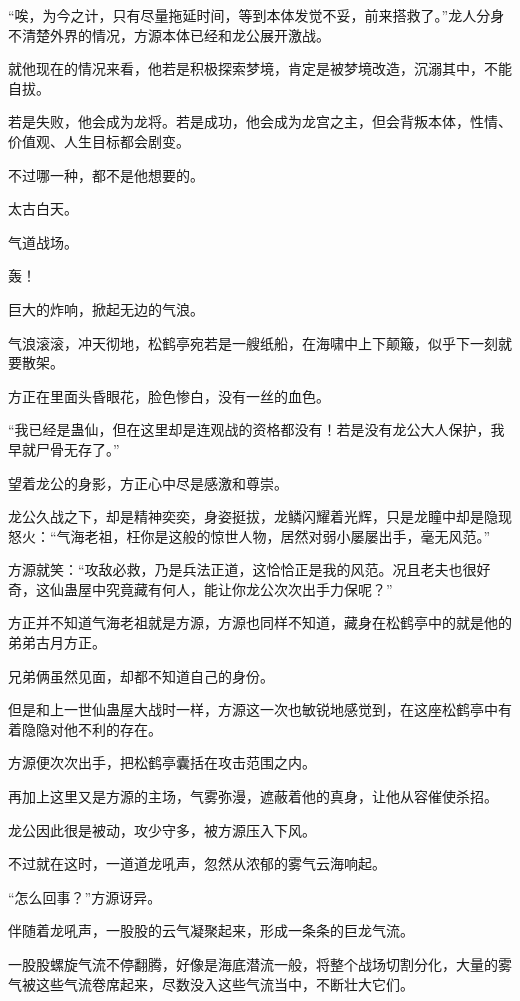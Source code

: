 \begin{this_body}
“唉，为今之计，只有尽量拖延时间，等到本体发觉不妥，前来搭救了。”龙人分身不清楚外界的情况，方源本体已经和龙公展开激战。

就他现在的情况来看，他若是积极探索梦境，肯定是被梦境改造，沉溺其中，不能自拔。

若是失败，他会成为龙将。若是成功，他会成为龙宫之主，但会背叛本体，性情、价值观、人生目标都会剧变。

不过哪一种，都不是他想要的。

太古白天。

气道战场。

轰！

巨大的炸响，掀起无边的气浪。

气浪滚滚，冲天彻地，松鹤亭宛若是一艘纸船，在海啸中上下颠簸，似乎下一刻就要散架。

方正在里面头昏眼花，脸色惨白，没有一丝的血色。

“我已经是蛊仙，但在这里却是连观战的资格都没有！若是没有龙公大人保护，我早就尸骨无存了。”

望着龙公的身影，方正心中尽是感激和尊崇。

龙公久战之下，却是精神奕奕，身姿挺拔，龙鳞闪耀着光辉，只是龙瞳中却是隐现怒火：“气海老祖，枉你是这般的惊世人物，居然对弱小屡屡出手，毫无风范。”

方源就笑：“攻敌必救，乃是兵法正道，这恰恰正是我的风范。况且老夫也很好奇，这仙蛊屋中究竟藏有何人，能让你龙公次次出手力保呢？”

方正并不知道气海老祖就是方源，方源也同样不知道，藏身在松鹤亭中的就是他的弟弟古月方正。

兄弟俩虽然见面，却都不知道自己的身份。

但是和上一世仙蛊屋大战时一样，方源这一次也敏锐地感觉到，在这座松鹤亭中有着隐隐对他不利的存在。

方源便次次出手，把松鹤亭囊括在攻击范围之内。

再加上这里又是方源的主场，气雾弥漫，遮蔽着他的真身，让他从容催使杀招。

龙公因此很是被动，攻少守多，被方源压入下风。

不过就在这时，一道道龙吼声，忽然从浓郁的雾气云海响起。

“怎么回事？”方源讶异。

伴随着龙吼声，一股股的云气凝聚起来，形成一条条的巨龙气流。

一股股螺旋气流不停翻腾，好像是海底潜流一般，将整个战场切割分化，大量的雾气被这些气流卷席起来，尽数没入这些气流当中，不断壮大它们。


\end{this_body}
